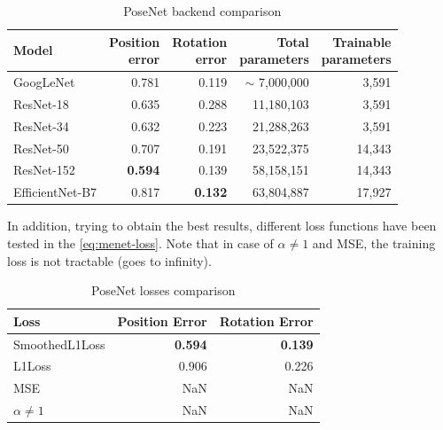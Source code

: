 \begin{table}[htbp]
    \caption{PoseNet backend comparison}
    \begin{center}
        \begin{tabular}{lrrrr}
            \toprule
            {Model}         & \thead{Position                                              \\error} & \thead{Rotation\\error} & \thead{Total\\parameters} & \thead{Trainable\\parameters} \\
            \midrule
            GoogLeNet       & 0.781           & 0.119          & $\sim$ 7,000,000 & 3,591  \\
            ResNet-18       & 0.635           & 0.288          & 11,180,103       & 3,591  \\
            ResNet-34       & 0.632           & 0.223          & 21,288,263       & 3,591  \\
            ResNet-50       & 0.707           & 0.191          & 23,522,375       & 14,343 \\
            ResNet-152      & \textbf{0.594}  & 0.139          & 58,158,151       & 14,343 \\
            EfficientNet-B7 & 0.817           & \textbf{0.132} & 63,804,887       & 17,927 \\
            \bottomrule
        \end{tabular}
        \label{tab:posenet-backends}
    \end{center}
\end{table}

In addition, trying to obtain the best results, different loss functions have been tested in the \cref{eq:menet-loss}. Note that in case of $\alpha \neq 1$ and MSE, the training loss is not tractable (goes to infinity).
\begin{table}[htbp]
    \caption{PoseNet losses comparison}
    \begin{center}
        \begin{tabular}{lrr}
            \toprule
            Loss            & {Position Error} & {Rotation Error} \\
            \midrule
            SmoothedL1Loss  & \textbf{0.594}   & \textbf{0.139}   \\
            L1Loss          & 0.906            & 0.226            \\
            MSE             & NaN              & NaN              \\
            $\alpha \neq 1$ & NaN              & NaN              \\
            \bottomrule
        \end{tabular}
        \label{tab:posenet-losses}
    \end{center}
\end{table}

